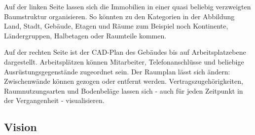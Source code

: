 Auf der linken Seite lassen sich die Immobilien in einer quasi beliebig 
verzweigten Baumstruktur organisieren. So könnten zu den Kategorien in der 
Abbildung Land, Stadt, Gebäude, Etagen und Räume zum Beispiel noch Kontinente, 
Ländergruppen, Halbetagen oder Raumteile kommen.

Auf der rechten Seite ist der CAD-Plan des Gebäudes bis auf Arbeitsplatzebene 
dargestellt. Arbeitsplätzen können Mitarbeiter, Telefonanschlüsse und beliebige 
Ausrüstungsgegenstände zugeordnet sein. Der Raumplan lässt sich ändern: 
Zwischenwände können gezogen oder entfernt werden. Vertragszugehörigkeiten, 
Raumnutzungsarten und Bodenbeläge lassen sich - auch für jeden Zeitpunkt in der 
Vergangenheit - visualisieren.

\subsection{Vision}